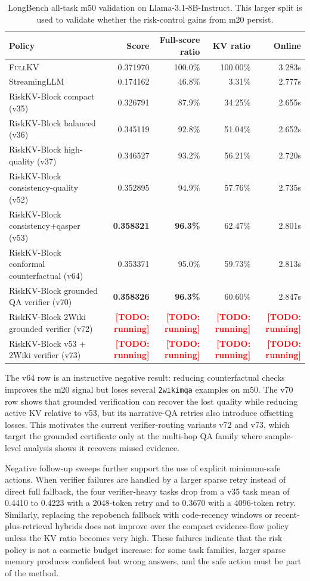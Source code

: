 \documentclass{article}
\newcommand{\todoexp}[1]{\textcolor{red}{\textbf{[TODO: #1]}}}
\newcommand{\method}{RiskKV-Block}
\newcommand{\fullkv}{\textsc{FullKV}}
\begin{document}
\begin{table}[t]
\centering
\caption{LongBench all-task m50 validation on Llama-3.1-8B-Instruct. This larger split is used to validate whether the risk-control gains from m20 persist.}
\label{tab:m50-validation}
\begin{tabular}{lrrrr}
\toprule
Policy & Score & Full-score ratio & KV ratio & Online \\
\midrule
\fullkv & 0.371970 & 100.0\% & 100.00\% & 3.283s \\
StreamingLLM & 0.174162 & 46.8\% & 3.31\% & 2.777s \\
\method{} compact (v35) & 0.326791 & 87.9\% & 34.25\% & 2.655s \\
\method{} balanced (v36) & 0.345119 & 92.8\% & 51.04\% & 2.652s \\
\method{} high-quality (v37) & 0.346527 & 93.2\% & 56.21\% & 2.720s \\
\method{} consistency-quality (v52) & 0.352895 & 94.9\% & 57.76\% & 2.735s \\
\method{} consistency+qasper (v53) & \textbf{0.358321} & \textbf{96.3\%} & 62.47\% & 2.801s \\
\method{} conformal counterfactual (v64) & 0.353371 & 95.0\% & 59.73\% & 2.813s \\
\method{} grounded QA verifier (v70) & \textbf{0.358326} & \textbf{96.3\%} & 60.60\% & 2.847s \\
\method{} 2Wiki grounded verifier (v72) & \todoexp{running} & \todoexp{running} & \todoexp{running} & \todoexp{running} \\
\method{} v53 + 2Wiki verifier (v73) & \todoexp{running} & \todoexp{running} & \todoexp{running} & \todoexp{running} \\
\bottomrule
\end{tabular}
\end{table}

The v64 row is an instructive negative result: reducing counterfactual checks improves the m20 signal but loses several \texttt{2wikimqa} examples on m50.
The v70 row shows that grounded verification can recover the lost quality while reducing active KV relative to v53, but its narrative-QA retries also introduce offsetting losses.
This motivates the current verifier-routing variants v72 and v73, which target the grounded certificate only at the multi-hop QA family where sample-level analysis shows it recovers missed evidence.

Negative follow-up sweeps further support the use of explicit minimum-safe actions.
When verifier failures are handled by a larger sparse retry instead of direct full fallback, the four verifier-heavy tasks drop from a v35 task mean of 0.4410 to 0.4223 with a 2048-token retry and to 0.3670 with a 4096-token retry.
Similarly, replacing the repobench fallback with code-recency windows or recent-plus-retrieval hybrids does not improve over the compact evidence-flow policy unless the KV ratio becomes very high.
These failures indicate that the risk policy is not a cosmetic budget increase: for some task families, larger sparse memory produces confident but wrong answers, and the safe action must be part of the method.
\end{document}
